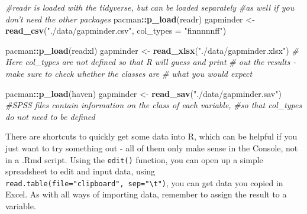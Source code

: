 \documentclass[
]{book}
\newenvironment{Shaded}{\begin{snugshade}}{\end{snugshade}}
\newcommand{\CommentTok}[1]{\textcolor[rgb]{0.56,0.35,0.01}{\textit{#1}}}
\newcommand{\DataTypeTok}[1]{\textcolor[rgb]{0.13,0.29,0.53}{#1}}
\newcommand{\KeywordTok}[1]{\textcolor[rgb]{0.13,0.29,0.53}{\textbf{#1}}}
\newcommand{\NormalTok}[1]{#1}
\newcommand{\OperatorTok}[1]{\textcolor[rgb]{0.81,0.36,0.00}{\textbf{#1}}}
\newcommand{\StringTok}[1]{\textcolor[rgb]{0.31,0.60,0.02}{#1}}
\begin{document}
\begin{Shaded}
\begin{Highlighting}[]
\CommentTok{#readr is loaded with the tidyverse, but can be loaded separately }
\CommentTok{#as well if you don't need the other packages}
\NormalTok{pacman}\OperatorTok{::}\KeywordTok{p_load}\NormalTok{(readr)}
\NormalTok{gapminder <-}\StringTok{ }\KeywordTok{read_csv}\NormalTok{(}\StringTok{"./data/gapminder.csv"}\NormalTok{, }\DataTypeTok{col_types =} \StringTok{"finnnnnff"}\NormalTok{)}

\NormalTok{pacman}\OperatorTok{::}\KeywordTok{p_load}\NormalTok{(readxl)}
\NormalTok{gapminder <-}\StringTok{ }\KeywordTok{read_xlsx}\NormalTok{(}\StringTok{"./data/gapminder.xlsx"}\NormalTok{) }
\CommentTok{# Here col_types are not defined so that R will guess and print }
\CommentTok{# out the results - make sure to check whether the classes are }
\CommentTok{# what you would expect}

\NormalTok{pacman}\OperatorTok{::}\KeywordTok{p_load}\NormalTok{(haven)}
\NormalTok{gapminder <-}\StringTok{ }\KeywordTok{read_sav}\NormalTok{(}\StringTok{"./data/gapminder.sav"}\NormalTok{) }
\CommentTok{#SPSS files contain information on the class of each variable, }
\CommentTok{#so that col_types do not need to be defined}
\end{Highlighting}
\end{Shaded}

There are shortcuts to quickly get some data into R, which can be helpful if you just want to try something out - all of them only make sense in the Console, not in a .Rmd script. Using the \texttt{edit()} function, you can open up a simple spreadsheet to edit and input data, using \texttt{read.table(file="clipboard",\ sep="\textbackslash{}t")}, you can get data you copied in Excel. As with all ways of importing data, remember to assign the result to a variable.
\end{document}
